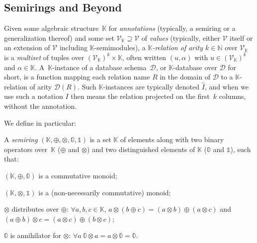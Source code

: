 \subsection{Semirings and Beyond}
\label{sec:semirings}

Given some algebraic structure~$\mathbb{K}$ for \emph{annotations} (typically, a semiring or a
generalization thereof) and some set
$\mathcal{V}_{\mathbb{K}}\supseteq\mathcal{V}$ of \emph{values} (typically, either
$\mathcal{V}$ itself or an extension of $\mathcal{V}$ including
$\mathbb{K}$-semimodules), a \emph{$\mathbb{K}$-relation of arity
	$k\in\mathbb{N}$} over $\mathcal{V}_{\mathbb{K}}$ is a \emph{multiset} of tuples over
$(\mathcal{V}_{\mathbb{K}})^k\times\mathbb{K}$, often written $(u,\alpha)$ with
$u\in(\mathcal{V}_{\mathbb{K}})^k$ and $\alpha\in\mathbb{K}$. A~$\mathbb{K}$-instance of a database
schema~$\mathcal{D}$, or $\mathbb{K}$-database over $\mathcal{D}$ for
short, is a function mapping each relation name $R$ in the domain of
$\mathcal{D}$ to a $\mathbb{K}$-relation of arity $\mathcal{D}(R)$.
 Such
$\mathbb{K}$-instances are typically denoted $\hat I$, and when we use
such a notation $I$ then means the relation projected on the first~$k$
columns, without the annotation.

We define in particular:
\begin{definition}
	A \emph{semiring} $(\mathbb{K},\oplus,\otimes,\mathbb 0,\mathbb 1)$ is
	a set $\mathbb K$ of elements along with two binary
	operators over~$\mathbb{K}$ ($\oplus$ and $\otimes$) and two distinguished
	elements of $\mathbb{K}$ ($\mathbb{0}$ and $\mathbb{1}$), such that:
	\begin{compactenum}[(i)]
		\item $(\mathbb{K}, \oplus, \mathbb{0})$ is a commutative monoid;
		\item $(\mathbb{K}, \otimes, \mathbb{1})$ is a (non-necessarily
		commutative) monoid;
		\item $\otimes$ distributes over $\oplus$: $\forall
			a,b,c\in\mathbb{K}$, $a\otimes(b\oplus c)=(a\otimes b)\oplus
			(a\otimes c)$ and $(a\oplus b)\otimes c=(a\otimes c)\oplus(b\otimes
			c)$;
		\item $\mathbb{0}$ is annihilator for $\otimes$: $\forall a\: \mathbb{0}\otimes
			a=a\otimes\mathbb{0}=\mathbb{0}$.
	\end{compactenum}
\end{definition}

